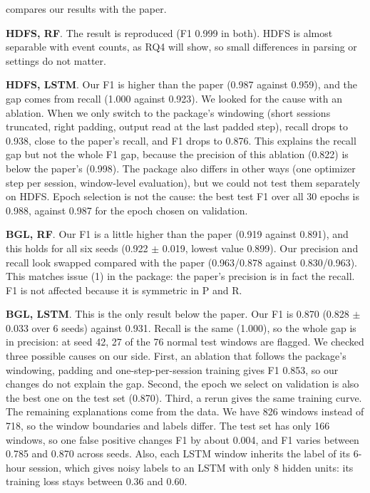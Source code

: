 \documentclass[10pt, conference]{IEEEtran}
\renewcommand{\paragraph}[1]{\noindent\textbf{#1}.}
\begin{document}
 compares our results with the paper.

\paragraph{HDFS, RF} The result is reproduced (F1 0.999 in both). HDFS is almost separable with event counts, as RQ4 will show, so small differences in parsing or settings do not matter.

\paragraph{HDFS, LSTM} Our F1 is higher than the paper (0.987 against 0.959), and the gap comes from recall (1.000 against 0.923). We looked for the cause with an ablation. When we only switch to the package's windowing (short sessions truncated, right padding, output read at the last padded step), recall drops to 0.938, close to the paper's recall, and F1 drops to 0.876. This explains the recall gap but not the whole F1 gap, because the precision of this ablation (0.822) is below the paper's (0.998). The package also differs in other ways (one optimizer step per session, window-level evaluation), but we could not test them separately on HDFS. Epoch selection is not the cause: the best test F1 over all 30 epochs is 0.988, against 0.987 for the epoch chosen on validation.

\paragraph{BGL, RF} Our F1 is a little higher than the paper (0.919 against 0.891), and this holds for all six seeds (0.922 $\pm$ 0.019, lowest value 0.899). Our precision and recall look swapped compared with the paper (0.963/0.878 against 0.830/0.963). This matches issue (1) in the package: the paper's precision is in fact the recall. F1 is not affected because it is symmetric in P and R.

\paragraph{BGL, LSTM} This is the only result below the paper. Our F1 is 0.870 (0.828 $\pm$ 0.033 over 6 seeds) against 0.931. Recall is the same (1.000), so the whole gap is in precision: at seed 42, 27 of the 76 normal test windows are flagged. We checked three possible causes on our side. First, an ablation that follows the package's windowing, padding and one-step-per-session training gives F1 0.853, so our changes do not explain the gap. Second, the epoch we select on validation is also the best one on the test set (0.870). Third, a rerun gives the same training curve. The remaining explanations come from the data. We have 826 windows instead of 718, so the window boundaries and labels differ. The test set has only 166 windows, so one false positive changes F1 by about 0.004, and F1 varies between 0.785 and 0.870 across seeds. Also, each LSTM window inherits the label of its 6-hour session, which gives noisy labels to an LSTM with only 8 hidden units: its training loss stays between 0.36 and 0.60.
\end{document}
